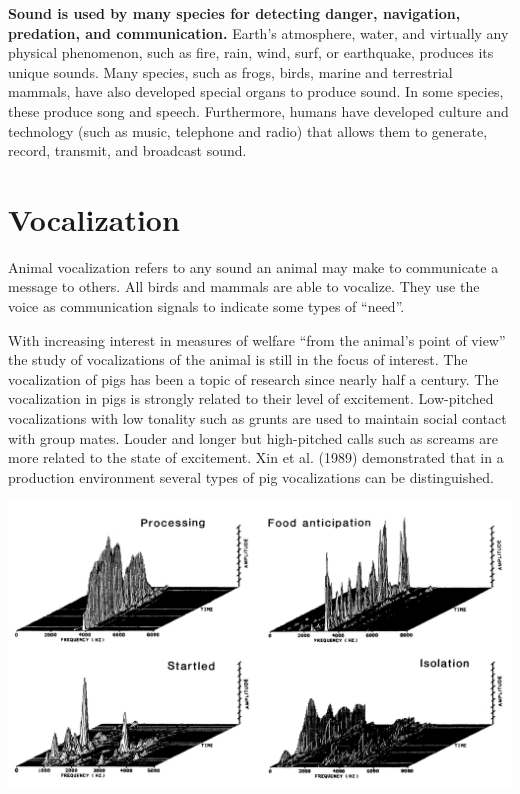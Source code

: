 \documentclass[]{book}
\begin{document}
\textbf{Sound is used by many species for detecting danger, navigation, predation, and communication.} Earth's atmosphere, water, and virtually any physical phenomenon, such as fire, rain, wind, surf, or earthquake, produces its unique sounds. Many species, such as frogs, birds, marine and terrestrial mammals, have also developed special organs to produce sound. In some species, these produce song and speech. Furthermore, humans have developed culture and technology (such as music, telephone and radio) that allows them to generate, record, transmit, and broadcast sound.

\hypertarget{vocalization}{%
\section{Vocalization}\label{vocalization}}

Animal vocalization refers to any sound an animal may make to communicate a message to others. All birds and mammals are able to vocalize. They use the voice as communication signals to indicate some types of ``need''.

With increasing interest in measures of welfare ``from the animal's point of view'' the study of vocalizations of the animal is still in the focus of interest. The vocalization of pigs has been a topic of research since nearly half a century. The vocalization in pigs is strongly related to their level of excitement. Low-pitched vocalizations with low tonality such as grunts are used to maintain social contact with group mates. Louder and longer but high-pitched calls such as screams are more related to the state of excitement. Xin et al. (1989) demonstrated that in a production environment several types of pig vocalizations can be distinguished.

\begin{center}\includegraphics[width=1\linewidth]{figures/pig-vocal1} \end{center}
\end{document}

